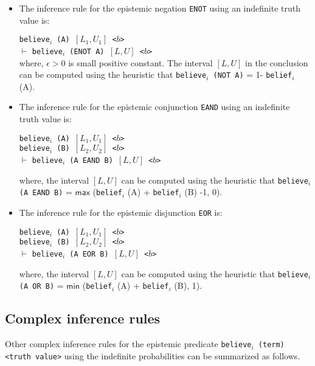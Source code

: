 \documentclass[12pt]{article}
\begin{document}
\begin{itemize}
\item
\noindent The inference rule for the epistemic negation \texttt{ENOT} using an indefinite truth value is:  

\noindent \texttt{believe$_i$ (A) $[L_1,U_1]$ <$b$>} \\
 $\vdash$
\texttt{believe$_i$ (ENOT A) $[L,U]$ <$b$>} \\

\noindent where, $\epsilon>0$ is small positive constant. The interval $[L,U]$ in the conclusion can be computed using the heuristic that \texttt{believe$_i$ (NOT A)} =  1- \texttt{belief}$_i$ (A).

\item  \noindent The inference rule for the epistemic conjunction \texttt{EAND} using an indefinite truth value is: 

\noindent \texttt{believe$_i$ (A) $[L_1,U_1]$ <$b$>} \\
 \texttt{believe$_i$ (B) $[L_2,U_2]$ <$b$>}\\
 $\vdash$
\texttt{believe$_i$ (A EAND B) $[L,U]$ <$b$>} 

where, the interval $[L,U]$ can be computed using the heuristic that \texttt{believe$_i$ (A EAND B)} =  $\mathsf{max}$ (\texttt{belief}$_i$ (A) + \texttt{belief}$_i$ (B) -1, 0).



 \item \noindent The inference rule for the epistemic disjunction \texttt{EOR} is: 

\noindent \texttt{believe$_i$ (A) $[L_1,U_1]$ <$b$>} \\
 \texttt{believe$_i$ (B) $[L_2,U_2]$ <$b$>}\\
 $\vdash$
\texttt{believe$_i$ (A EOR B) $[L,U]$ <$b$>} 

where, the interval $[L,U]$ can be computed using the heuristic that \texttt{believe$_i$ (A OR B)} =  $\mathsf{min}$ (\texttt{belief}$_i$ (A) + \texttt{belief}$_i$ (B), 1).
\end{itemize}


\subsection{Complex inference rules} 
Other complex inference rules for the epistemic predicate  \texttt{believe$_i$ (term) <truth value>} using the indefinite probabilities can be summarized as follows.
\end{document}
